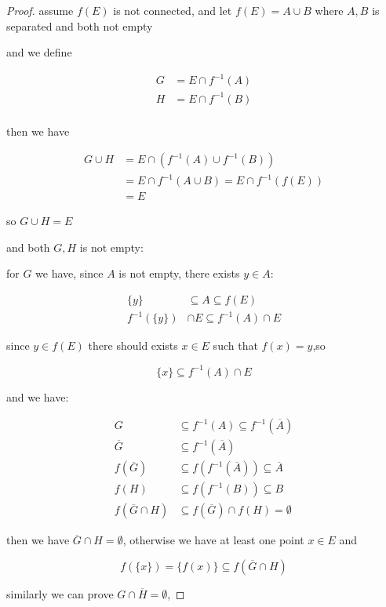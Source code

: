 \begin{proof}
    assume $f(E)$ is not connected, and let $f(E) = A \cup B$ where $A, B$ is separated and both not empty

    and we define

    \begin{align*}
        G &= E \cap f^{-1}(A) \\
        H &= E \cap f^{-1}(B) \\
    \end{align*}

    then we have

    \begin{align*}
        G \cup H &= E \cap (f^{-1}(A) \cup f^{-1}(B))  \\
        &= E \cap f^{-1}(A \cup B) = E \cap f^{-1}(f(E)) \\
        & = E
    \end{align*}

    so $G \cup H = E$

    and both $G, H$ is not empty:

    for $G$ we have, since $A$ is not empty, there exists $y \in A$:

    \begin{align*}
        \{y \} & \subseteq A \subseteq f(E) \\
        f^{-1}(\{ y \}) & \cap E \subseteq f^{-1}(A) \cap E
    \end{align*}

    since $y \in f(E)$ there should exists $x \in E$ such that $f(x) = y$,so

    \[
        \{ x \} \subseteq f^{-1}(A) \cap E
    \]


    and we have:

    \begin{align*}
        G &\subseteq f^{-1}(A) \subseteq f^{-1}(\overline{A}) \\
        \overline{G} & \subseteq f^{-1}(\overline{A}) \\
        f(\overline{G}) & \subseteq f(f^{-1}(\overline{A})) \subseteq \overline{A} \\
        f(H) & \subseteq f(f^{-1}(B)) \subseteq B \\
        f(\overline{G} \cap H) & \subseteq f(\overline{G}) \cap f(H) = \emptyset
    \end{align*}

    then we have $\overline{G} \cap H = \emptyset$, otherwise we have at least one point $x \in E$ and

    \[
        f(\{ x \}) = \{ f(x)\} \subseteq f(\overline{G} \cap H)
    \]

    similarly we can prove $G \cap \overline{H} = \emptyset$, 
\end{proof}

